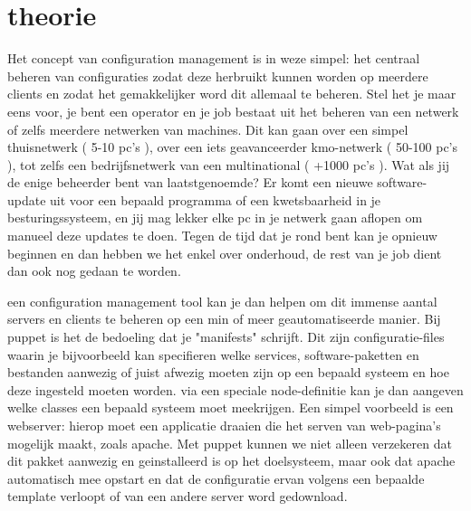 \chapter{theorie}

Het concept van configuration management is in weze simpel: het centraal beheren van configuraties zodat deze herbruikt kunnen worden op meerdere clients en zodat het gemakkelijker word dit allemaal te beheren.
Stel het je maar eens voor, je bent een operator en je job bestaat uit het beheren van een netwerk of zelfs meerdere netwerken van machines.
Dit kan gaan over een simpel thuisnetwerk ( 5-10 pc's ), over een iets geavanceerder kmo-netwerk ( 50-100 pc's ), tot zelfs een bedrijfsnetwerk van een multinational ( +1000 pc's ).
Wat als jij de enige beheerder bent van laatstgenoemde? Er komt een nieuwe software-update uit voor een bepaald programma of een kwetsbaarheid in je besturingssysteem, en jij mag lekker elke pc in je netwerk gaan aflopen om manueel deze updates te doen.
Tegen de tijd dat je rond bent kan je opnieuw beginnen en dan hebben we het enkel over onderhoud, de rest van je job dient dan ook nog gedaan te worden.

een configuration management tool kan je dan helpen om dit immense aantal servers en clients te beheren op een min of meer geautomatiseerde manier.
Bij puppet is het de bedoeling dat je "manifests" schrijft. Dit zijn configuratie-files waarin je bijvoorbeeld kan specifieren welke services, software-paketten en bestanden aanwezig of juist afwezig moeten zijn op een bepaald systeem en hoe deze ingesteld moeten worden. via een speciale node-definitie kan je dan aangeven welke classes een bepaald systeem moet meekrijgen. Een simpel voorbeeld is een webserver: hierop moet een applicatie draaien die het serven van web-pagina's mogelijk maakt, zoals apache. Met puppet kunnen we niet alleen verzekeren dat dit pakket aanwezig en geinstalleerd is op het doelsysteem, maar ook dat apache automatisch mee opstart en dat de configuratie ervan volgens een bepaalde template verloopt of van een andere server word gedownload.

